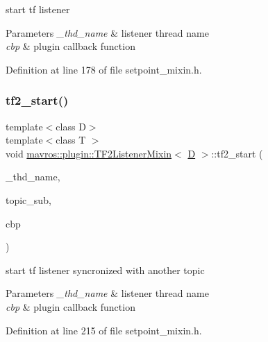 start tf listener 


\begin{DoxyParams}{Parameters}
{\em \+\_\+thd\+\_\+name} & listener thread name \\
\hline
{\em cbp} & plugin callback function \\
\hline
\end{DoxyParams}


Definition at line 178 of file setpoint\+\_\+mixin.\+h.

\mbox{\label{group__plugin_gab0cf1ee9c93e92fdcabb98e9eba093c5}} 
\subsubsection{\texorpdfstring{tf2\_start()}{tf2\_start()}\hspace{0.1cm}{\footnotesize\ttfamily [2/2]}}
{\footnotesize\ttfamily template$<$class D$>$ \\
template$<$class T $>$ \\
void \mbox{\hyperlink{classmavros_1_1plugin_1_1TF2ListenerMixin}{mavros\+::plugin\+::\+T\+F2\+Listener\+Mixin}}$<$ \mbox{\hyperlink{mavlink__sha256_8h_af316c33cc298530f245e8b55330e86b5}{D}} $>$\+::tf2\+\_\+start (\begin{DoxyParamCaption}\item[{const char $\ast$}]{\+\_\+thd\+\_\+name,  }\item[{message\+\_\+filters\+::\+Subscriber$<$ T $>$ \&}]{topic\+\_\+sub,  }\item[{void(D\+::$\ast$)(const geometry\+\_\+msgs\+::\+Transform\+Stamped \&, const typename T\+::\+Const\+Ptr \&)}]{cbp }\end{DoxyParamCaption})\hspace{0.3cm}{\ttfamily [inline]}}



start tf listener syncronized with another topic 


\begin{DoxyParams}{Parameters}
{\em \+\_\+thd\+\_\+name} & listener thread name \\
\hline
{\em cbp} & plugin callback function \\
\hline
\end{DoxyParams}


Definition at line 215 of file setpoint\+\_\+mixin.\+h.

